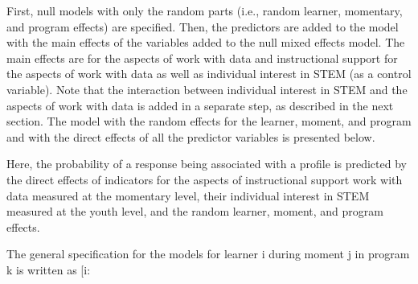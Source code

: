 \documentclass[]{msu-thesis}
\theoremstyle{definition}
\theoremstyle{definition}
\theoremstyle{definition}
\theoremstyle{remark}
\begin{document}
First, null models with only the random parts (i.e., random learner,
momentary, and program effects) are specified. Then, the predictors are
added to the model with the main effects of the variables added to the
null mixed effects model. The main effects are for the aspects of work
with data and instructional support for the aspects of work with data as
well as individual interest in STEM (as a control variable). Note that
the interaction between individual interest in STEM and the aspects of
work with data is added in a separate step, as described in the next
section. The model with the random effects for the learner, moment, and
program and with the direct effects of all the predictor variables is
presented below.

Here, the probability of a response being associated with a profile is
predicted by the direct effects of indicators for the aspects of
instructional support work with data measured at the momentary level,
their individual interest in STEM measured at the youth level, and the
random learner, moment, and program effects.

The general specification for the models for learner i during moment j
in program k is written as {[}i:
\end{document}

